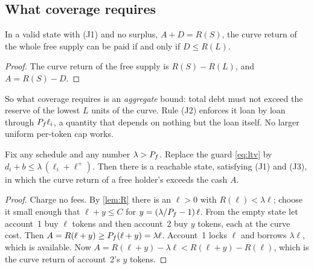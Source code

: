 \subsection{What coverage requires}

\begin{lemma}\label{lem:exact}
In a valid state with (J1) and no surplus, $A+D=R(S)$, the curve return of the whole free supply can be paid if and only if $D\le R(L)$.
\end{lemma}
\begin{proof}
The curve return of the free supply is $R(S)-R(L)$, and $A=R(S)-D$.
\end{proof}

So what coverage requires is an \emph{aggregate} bound: total debt must not exceed the reserve of the lowest $L$ units of the curve. Rule (J2) enforces it loan by loan through $P_f\ell_i$, a quantity that depends on nothing but the loan itself. No larger uniform per-token cap works.

\begin{proposition}[Tightness]\label{prop:tight}
Fix any schedule and any number $\lambda>P_f$. Replace the guard \eqref{eq:ltv} by $d_i+b\le\lambda\,(\ell_i+\ell^+)$. Then there is a reachable state, satisfying (J1) and (J3), in which the curve return of a free holder's  exceeds the cash $A$.
\end{proposition}
\begin{proof}
Charge no fees. By \cref{lem:R} there is an $\ell>0$ with $R(\ell)<\lambda\ell$; choose it small enough that $\ell+y\le C$ for $y=(\lambda/P_f-1)\,\ell$. From the empty state let account~1 buy $\ell$ tokens and then account~2 buy $y$ tokens, each at the curve cost. Then $A=R(\ell+y)\ge P_f(\ell+y)=\lambda\ell$. Account~1 locks $\ell$ and borrows $\lambda\ell$, which is available. Now $A=R(\ell+y)-\lambda\ell<R(\ell+y)-R(\ell)$, which is the curve return of account~2's $y$ tokens.
\end{proof}
